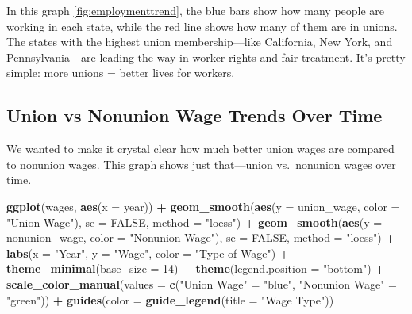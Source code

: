 \documentclass[
]{book}
\newenvironment{Shaded}{\begin{snugshade}}{\end{snugshade}}
\newcommand{\AttributeTok}[1]{\textcolor[rgb]{0.13,0.29,0.53}{#1}}
\newcommand{\ConstantTok}[1]{\textcolor[rgb]{0.56,0.35,0.01}{#1}}
\newcommand{\DecValTok}[1]{\textcolor[rgb]{0.00,0.00,0.81}{#1}}
\newcommand{\FunctionTok}[1]{\textcolor[rgb]{0.13,0.29,0.53}{\textbf{#1}}}
\newcommand{\NormalTok}[1]{#1}
\newcommand{\OtherTok}[1]{\textcolor[rgb]{0.56,0.35,0.01}{#1}}
\newcommand{\SpecialCharTok}[1]{\textcolor[rgb]{0.81,0.36,0.00}{\textbf{#1}}}
\newcommand{\StringTok}[1]{\textcolor[rgb]{0.31,0.60,0.02}{#1}}
\theoremstyle{definition}
\theoremstyle{definition}
\theoremstyle{definition}
\theoremstyle{definition}
\theoremstyle{remark}
\begin{document}
In this graph \ref{fig:employmenttrend}, the blue bars show how many people are working in each state, while the red line shows how many of them are in unions. The states with the highest union membership---like California, New York, and Pennsylvania---are leading the way in worker rights and fair treatment. It's pretty simple: more unions = better lives for workers.

\subsection{Union vs Nonunion Wage Trends Over Time}\label{union-vs-nonunion-wage-trends-over-time}

We wanted to make it crystal clear how much better union wages are compared to nonunion wages. This graph shows just that---union vs.~nonunion wages over time.

\begin{Shaded}
\begin{Highlighting}[]
\FunctionTok{ggplot}\NormalTok{(wages, }\FunctionTok{aes}\NormalTok{(}\AttributeTok{x =}\NormalTok{ year)) }\SpecialCharTok{+}
  \FunctionTok{geom\_smooth}\NormalTok{(}\FunctionTok{aes}\NormalTok{(}\AttributeTok{y =}\NormalTok{ union\_wage, }\AttributeTok{color =} \StringTok{"Union Wage"}\NormalTok{), }
              \AttributeTok{se =} \ConstantTok{FALSE}\NormalTok{, }\AttributeTok{method =} \StringTok{"loess"}\NormalTok{) }\SpecialCharTok{+}
  \FunctionTok{geom\_smooth}\NormalTok{(}\FunctionTok{aes}\NormalTok{(}\AttributeTok{y =}\NormalTok{ nonunion\_wage, }\AttributeTok{color =} \StringTok{"Nonunion Wage"}\NormalTok{), }
              \AttributeTok{se =} \ConstantTok{FALSE}\NormalTok{, }\AttributeTok{method =} \StringTok{"loess"}\NormalTok{) }\SpecialCharTok{+}
  \FunctionTok{labs}\NormalTok{(}\AttributeTok{x =} \StringTok{"Year"}\NormalTok{, }\AttributeTok{y =} \StringTok{"Wage"}\NormalTok{,}
       \AttributeTok{color =} \StringTok{"Type of Wage"}\NormalTok{) }\SpecialCharTok{+}
  \FunctionTok{theme\_minimal}\NormalTok{(}\AttributeTok{base\_size =} \DecValTok{14}\NormalTok{) }\SpecialCharTok{+}
  \FunctionTok{theme}\NormalTok{(}\AttributeTok{legend.position =} \StringTok{"bottom"}\NormalTok{) }\SpecialCharTok{+}
  \FunctionTok{scale\_color\_manual}\NormalTok{(}\AttributeTok{values =} \FunctionTok{c}\NormalTok{(}\StringTok{"Union Wage"} \OtherTok{=} \StringTok{"blue"}\NormalTok{, }\StringTok{"Nonunion Wage"} \OtherTok{=} \StringTok{"green"}\NormalTok{)) }\SpecialCharTok{+}
  \FunctionTok{guides}\NormalTok{(}\AttributeTok{color =} \FunctionTok{guide\_legend}\NormalTok{(}\AttributeTok{title =} \StringTok{"Wage Type"}\NormalTok{))}
\end{Highlighting}
\end{Shaded}
\end{document}

